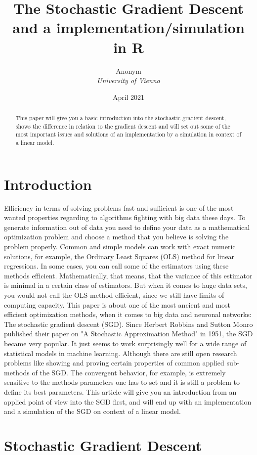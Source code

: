 \documentclass{article}
\title{\textbf{The Stochastic Gradient Descent and a implementation/simulation in R}}
\date{April 2021}
\author{Anonym\\ \textit{University of Vienna}}
\begin{document}
\maketitle

\begin{abstract}
This paper will give you a basic introduction into the stochastic gradient descent, shows the difference in relation to the gradient descent and will set out some of the most important issues and solutions of an implementation by a simulation in context of a linear model. 
\end{abstract}


\section{Introduction}
Efficiency in terms of solving problems fast and sufficient is one of the most wanted properties regarding to algorithms fighting with big data these days. To generate information out of data you need to define your data as a mathematical optimization problem and choose a method that you believe is solving the problem properly. Common and simple models can work with exact numeric solutions, for example, the Ordinary Least Squares (OLS) method for linear regressions. In some cases, you can call some of the estimators using these methods efficient. Mathematically, that means, that the variance of this estimator is minimal in a certain class of estimators. But when it comes to huge data sets, you would not call the OLS method efficient, since we still have limits of computing capacity. This paper is about one of the most ancient and most efficient optimization methods, when it comes to big data and neuronal networks: The stochastic gradient descent (SGD). Since Herbert Robbins and Sutton Monro \cite{Herbert} published their paper on "A Stochastic Approximation Method" in 1951, the SGD became very popular. It just seems to work surprisingly well for a wide range of statistical models in machine learning. Although there are still open research problems like showing and proving certain properties of common applied sub-methods of the SGD. The convergent behavior, for example, is extremely sensitive to the methods parameters one has to set and it is still a problem to define its best parameters. This article will give you an introduction from an applied point of view into the SGD first, and will end up with an implementation and a simulation of the SGD on context of a linear model.  
\pagebreak

\section{Stochastic Gradient Descent}
\end{document}
